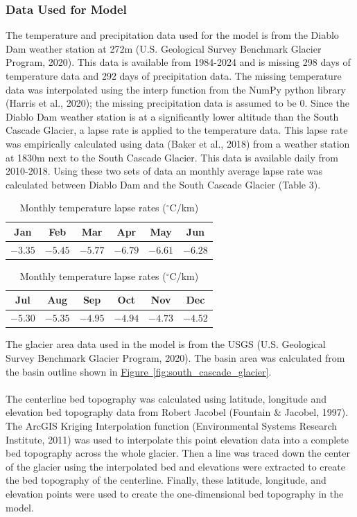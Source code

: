 \documentclass{article}
\begin{document}
\subsubsection{Data Used for Model}
The temperature and precipitation data used for the model is from the Diablo Dam weather station at 272m (U.S. Geological Survey Benchmark Glacier Program, 2020). This data is available from 1984-2024 
and is missing 298 days of temperature data and 292 days of precipitation data. The missing temperature data was interpolated 
using the interp function from the NumPy python library (Harris et al., 2020); the missing precipitation data is assumed to be 0. Since the Diablo Dam
weather station is at a significantly lower altitude than the South Cascade Glacier, a lapse rate is applied to the temperature data. This lapse 
rate was empirically calculated using data (Baker et al., 2018) from a weather station at 1830m next to the South Cascade Glacier. This data is available daily from 
2010-2018. Using these two sets of data an monthly average lapse rate was calculated between Diablo Dam and the South Cascade Glacier (Table 3). 
\begin{table}[h!]
    \centering
    \small
    \begin{tabular}{|*{6}{c|}}
      \hline
      Jan & Feb & Mar & Apr & May & Jun \\ 
      \hline
      $-3.35$ & $-5.45$ & $-5.77$ & $-6.79$ & $-6.61$ & $-6.28$ \\
      \hline
    \end{tabular}
    \begin{tabular}{|*{6}{c|}}
      \hline
      Jul & Aug & Sep & Oct & Nov & Dec \\ 
      \hline
      $-5.30$ & $-5.35$ & $-4.95$ & $-4.94$ & $-4.73$ & $-4.52$ \\
      \hline
    \end{tabular}
    \caption{Monthly temperature lapse rates ($^\circ$C/km)}
    \label{tab:temp_lapse_rates}
  \end{table}
\FloatBarrier
The glacier area data used in the model is from the USGS (U.S. Geological Survey Benchmark Glacier Program, 2020). The basin area was calculated from the 
basin outline shown in \hyperref[fig:south_cascade_glacier]{Figure~\ref{fig:south_cascade_glacier}}.
\paragraph{}
The centerline bed topography was calculated using latitude, longitude and elevation bed topography data from Robert Jacobel (Fountain \& Jacobel, 1997). 
The ArcGIS Kriging Interpolation function (Environmental Systems Research Institute, 2011) was used to interpolate this point elevation data into a complete 
bed topography across the whole glacier. Then a line was traced down the center of the glacier using the interpolated bed and elevations 
were extracted to create the bed topography of the centerline. Finally, these latitude, longitude, and elevation points were used to create 
the one-dimensional bed topography in the model.
\end{document}
